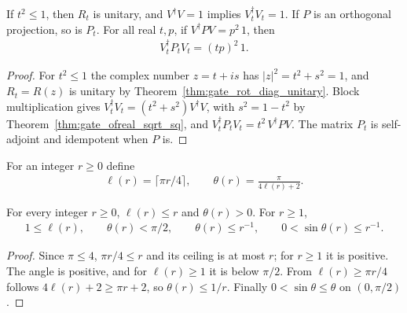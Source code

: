 \begin{theorem}
    \label{thm:gate_uniform_success_attenuation}
    \leanok
    If $t^2\leq1$, then $R_t$ is unitary, and $V^\dagger V=1$ implies
    $V_t^\dagger V_t=1$. If $P$ is an orthogonal projection, so is $P_t$.
    For all real $t,p$, if $V^\dagger PV=p^2\,1$, then
    \begin{align}
        V_t^\dagger P_tV_t=(tp)^2\,1.
    \end{align}
\end{theorem}
\begin{proof}\leanok
    For $t^2\leq1$ the complex number $z=t+is$ has $|z|^2=t^2+s^2=1$, and
    $R_t=R(z)$ is unitary by Theorem~\ref{thm:gate_rot_diag_unitary}. Block
    multiplication gives $V_t^\dagger V_t=(t^2+s^2)V^\dagger V$, with
    $s^2=1-t^2$ by Theorem~\ref{thm:gate_ofreal_sqrt_sq}, and
    $V_t^\dagger P_tV_t=t^2\,V^\dagger PV$. The matrix $P_t$ is
    self-adjoint and idempotent when $P$ is.
\end{proof}

\begin{definition}
    \label{def:gate_amplification_budget}
    \leanok
    For an integer $r\geq0$ define
    \begin{align}
        \ell(r)=\lceil\pi r/4\rceil,
        \qquad \theta(r)=\frac{\pi}{4\ell(r)+2}.
    \end{align}
\end{definition}

\begin{theorem}
    \label{thm:gate_amplification_budget}
    \leanok
    For every integer $r\geq0$, $\ell(r)\leq r$ and $\theta(r)>0$. For
    $r\geq1$,
    \begin{align}
        1\leq\ell(r),\qquad
        \theta(r)<\pi/2,\qquad
        \theta(r)\leq r^{-1},\qquad
        0<\sin\theta(r)\leq r^{-1}.
    \end{align}
\end{theorem}
\begin{proof}\leanok
    Since $\pi\leq4$, $\pi r/4\leq r$ and its ceiling is at most $r$; for
    $r\geq1$ it is positive. The angle is positive, and for $\ell(r)\geq1$
    it is below $\pi/2$. From $\ell(r)\geq\pi r/4$ follows
    $4\ell(r)+2\geq\pi r+2$, so $\theta(r)\leq1/r$. Finally
    $0<\sin\theta\leq\theta$ on $(0,\pi/2)$.
\end{proof}
